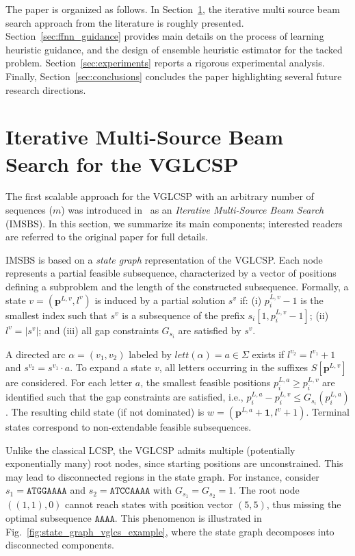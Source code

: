 \documentclass[runningheads]{llncs}
\begin{document}
The paper is organized as follows. In Section~\ref{sec:imsbs}, the iterative multi source beam search approach from the literature is roughly presented. Section~\ref{sec:ffnn_guidance} provides main details on the process of learning heuristic guidance, and the design of ensemble heuristic estimator for the tacked problem. Section~\ref{sec:experiments} reports a rigorous experimental analysis. Finally, Section~\ref{sec:conclusions} concludes the paper highlighting several future research directions. 
 
 
\section{Iterative Multi-Source Beam Search for the VGLCSP}\label{sec:imsbs}

The first scalable approach for the VGLCSP with an arbitrary number of sequences ($m$) was introduced in~\cite{djukanovic2026_eurocast} as an \textit{Iterative Multi-Source Beam Search} (IMSBS). In this section, we summarize its main components; interested readers are referred to the original paper for full details.

IMSBS is based on a \textit{state graph} representation of the VGLCSP. Each node represents a partial feasible subsequence, characterized by a vector of positions defining a subproblem and the length of the constructed subsequence. Formally, a state $v=(\mathbf{p}^{L,v}, l^v)$ is induced by a partial solution $s^v$ if: (i) $p^{L,v}_i-1$ is the smallest index such that $s^v$ is a subsequence of the prefix $s_i[1, p^{L,v}_i-1]$; (ii) $l^v=|s^v|$; and (iii) all gap constraints $G_{s_i}$ are satisfied by $s^v$. 

A directed arc $\alpha=(v_1, v_2)$ labeled by $lett(\alpha)=a \in \Sigma$ exists if $l^{v_2}=l^{v_1}+1$ and $s^{v_2}=s^{v_1}\cdot a$. To expand a state $v$, all letters occurring in the suffixes $S[\mathbf{p}^{L,v}]$ are considered. For each letter $a$, the smallest feasible positions $p^{L,a}_i \geq p^{L,v}_i$ are identified such that the gap constraints are satisfied, i.e., $p^{L,a}_i - p^{L,v}_i \leq G_{s_i}(p^{L,a}_i)$. The resulting child state (if not dominated) is $w=(\mathbf{p}^{L,a}+\mathbf{1}, l^v+1)$. Terminal states correspond to non-extendable feasible subsequences.

Unlike the classical LCSP, the VGLCSP admits multiple (potentially exponentially many) root nodes, since starting positions are unconstrained. This may lead to disconnected regions in the state graph. For instance, consider $s_1=\texttt{ATGGAAAA}$ and $s_2=\texttt{ATCCAAAA}$ with $G_{s_1}=G_{s_2}=1$. The root node $((1,1),0)$ cannot reach states with position vector $(5,5)$, thus missing the optimal subsequence $\texttt{AAAA}$. This phenomenon is illustrated in Fig.~\ref{fig:state_graph_vglcs_example}, where the state graph decomposes into disconnected components.
\end{document}
